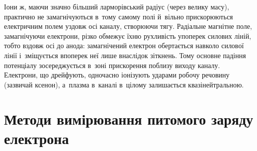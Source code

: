 Іони ж, маючи значно більший ларморівський радіус (через велику масу), практично не замагнічуються в~тому самому полі й~вільно прискорюються електричним полем уздовж осі каналу, створюючи тягу. Радіальне магнітне поле, замагнічуючи електрони, різко обмежує їхню рухливість упоперек силових ліній, тобто вздовж осі до анода: замагнічений електрон обертається навколо силової лінії і~зміщується впоперек неї лише внаслідок зіткнень. Тому основне падіння потенціалу зосереджується в~зоні прискорення поблизу виходу каналу. Електрони, що дрейфують, одночасно іонізують ударами робочу речовину (зазвичай ксенон), а~плазма в~каналі в~цілому залишається квазінейтральною.

%


\section{Методи вимірювання питомого заряду електрона}\hypertarget{charge-to-mass-ratio}{}

